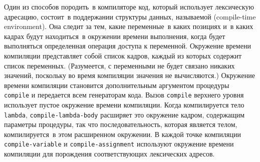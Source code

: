 Один из способов породить~в компиляторе код, который
использует лексическую адресацию, состоит~в поддержании структуры
данных, называемой  (compile-time environment).  Она следит за тем, какие переменные~в каких позициях
и~в каких кадрах будут находиться~в окружении времени выполнения,
когда будет выполняться определенная операция доступа к переменной.
Окружение времени компиляции представляет собой список кадров, каждый
из которых содержит список переменных.  (Разумеется, с переменными не
будет связано никаких значений, поскольку во время компиляции значения
не вычисляются.)  Окружение времени компиляции становится
дополнительным аргументом процедуры {\tt compile} и передается
всем генераторам кода.  Вызов {\tt compile} верхнего уровня
использует пустое окружение времени компиляции.  Когда компилируется
тело {\tt lambda}, {\tt compile-lambda-body} расширяет
это окружение кадром, содержащим параметры процедуры, так что
последовательность, которая является телом, компилируется~в этом
расширенном окружении.  В каждой точке компиляции
{\tt compile-variable} и {\tt compile-assignment}
используют окружение времени компиляции для порождения соответствующих
лексических адресов.


